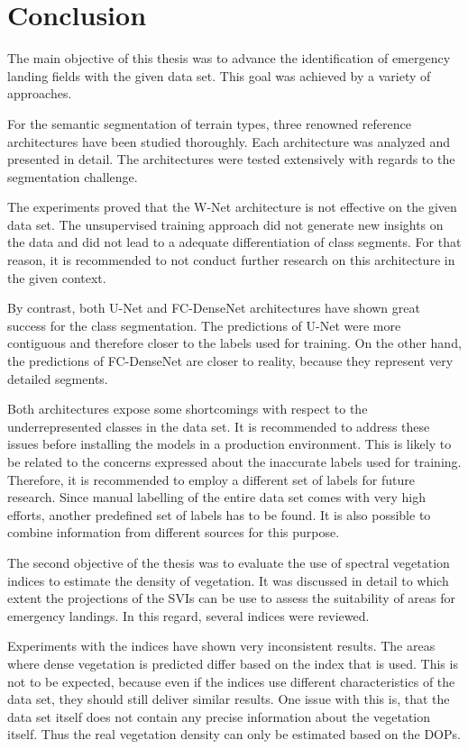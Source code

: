 \section{Conclusion}
The main objective of this thesis was to advance the identification of emergency landing fields with the given data set. This goal was achieved by a variety of approaches.

For the semantic segmentation of terrain types, three renowned reference architectures have been studied thoroughly. Each architecture was analyzed and presented in detail. The architectures were tested extensively with regards to the segmentation challenge.

The experiments proved that the W-Net architecture is not effective on the given data set. The unsupervised training approach did not generate new insights on the data and did not lead to a adequate differentiation of class segments. For that reason, it is recommended to not conduct further research on this architecture in the given context.

By contrast, both U-Net and FC-DenseNet architectures have shown great success for the class segmentation. The predictions of U-Net were more contiguous and therefore closer to the labels used for training. On the other hand, the predictions of FC-DenseNet are closer to reality, because they represent very detailed segments. 

Both architectures expose some shortcomings with respect to the underrepresented classes in the data set. It is recommended to address these issues before installing the models in a production environment. This is likely to be related to the concerns expressed about the inaccurate labels used for training. Therefore, it is recommended to employ a different set of labels for future research. Since manual labelling of the entire data set comes with very high efforts, another predefined set of labels has to be found. It is also possible to combine information from different sources for  this purpose.  

The second objective of the thesis was to evaluate the use of spectral vegetation indices to estimate the density of vegetation. It was discussed in detail to which extent the projections of the SVIs can be use to assess the suitability of areas for emergency landings. In this regard, several indices were reviewed.

Experiments with the indices have shown very inconsistent results. The areas where dense vegetation is predicted differ based on the index that is used. This is not to be expected, because even if the indices use different characteristics of the data set, they should still deliver similar results. One issue with this is, that the data set itself does not contain any precise information about the vegetation itself. Thus the real vegetation density can only be estimated based on the DOPs.

